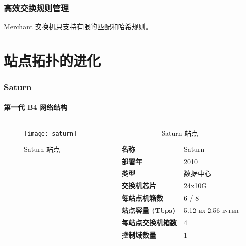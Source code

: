     \begin{frame}
        \frametitle{高效交换规则管理}
        Merchant 交换机只支持有限的匹配和哈希规则。

    \end{frame}

    \section{站点拓扑的进化}


    \begin{frame}
        \frametitle{Saturn}
        \framesubtitle{第一代 B4 网络结构}
        \begin{columns}
            \begin{column}{0.4\textwidth}
                \begin{figure}
                    \texttt{[image: saturn]}
                    \caption{Saturn 站点}
                \end{figure}
            \end{column}
            \begin{column}{0.6\textwidth}
                \begin{table}
                    \begin{tabular}{>{\bfseries}ll}
                        \toprule
                        名称 & Saturn \\
                        部署年 & 2010 \\
                        类型 & 数据中心 \\
                        交换机芯片 & 24x10G \\
                        每站点机箱数 & 6 / 8 \\
                        站点容量 (Tbps) & 5.12 \textsc{ex} 2.56 \textsc{inter}\\
                        每站点交换机箱数 & 4 \\
                        控制域数量 & 1 \\
                        \bottomrule
                    \end{tabular}
                    \caption{Saturn 站点}\label{tab:saturn}
                \end{table}
            \end{column}
        \end{columns}
    \end{frame}

